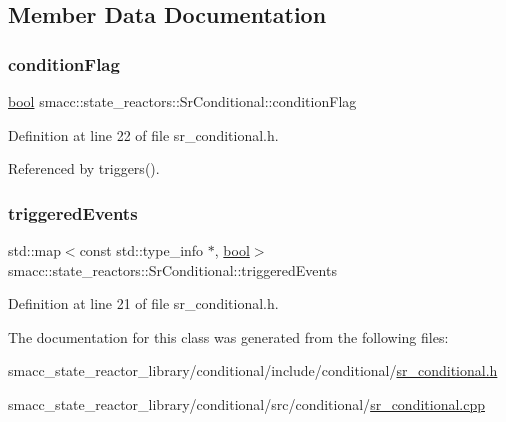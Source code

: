 \subsection{Member Data Documentation}
\mbox{\label{classsmacc_1_1state__reactors_1_1SrConditional_a3642c78c02f02ed8eb0e5a41240f445c}} 
\subsubsection{\texorpdfstring{condition\+Flag}{conditionFlag}}
{\footnotesize\ttfamily \hyperlink{classbool}{bool} smacc\+::state\+\_\+reactors\+::\+Sr\+Conditional\+::condition\+Flag\hspace{0.3cm}{\ttfamily [private]}}



Definition at line 22 of file sr\+\_\+conditional.\+h.



Referenced by triggers().

\mbox{\label{classsmacc_1_1state__reactors_1_1SrConditional_a6d841c624d6f6875db2ab6c6314bc3e1}} 
\subsubsection{\texorpdfstring{triggered\+Events}{triggeredEvents}}
{\footnotesize\ttfamily std\+::map$<$const std\+::type\+\_\+info $\ast$, \hyperlink{classbool}{bool}$>$ smacc\+::state\+\_\+reactors\+::\+Sr\+Conditional\+::triggered\+Events\hspace{0.3cm}{\ttfamily [private]}}



Definition at line 21 of file sr\+\_\+conditional.\+h.



The documentation for this class was generated from the following files\+:\begin{DoxyCompactItemize}
\item 
smacc\+\_\+state\+\_\+reactor\+\_\+library/conditional/include/conditional/\hyperlink{sr__conditional_8h}{sr\+\_\+conditional.\+h}\item 
smacc\+\_\+state\+\_\+reactor\+\_\+library/conditional/src/conditional/\hyperlink{sr__conditional_8cpp}{sr\+\_\+conditional.\+cpp}\end{DoxyCompactItemize}
